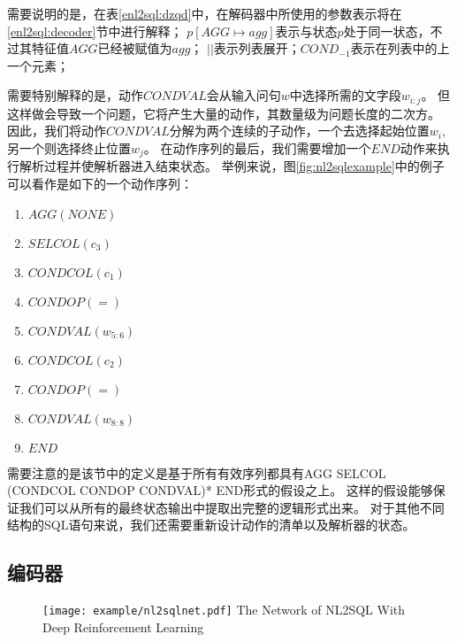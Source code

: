 需要说明的是，在表\ref{enl2sql:dzqd}中，在解码器中所使用的参数表示将在\ref{enl2sql:decoder}节中进行解释；
$p[AGG \mapsto agg]$表示与状态$p$处于同一状态，不过其特征值$AGG$已经被赋值为$agg$；
$||$表示列表展开；$COND_{-1}$表示在列表中的上一个元素；


需要特别解释的是，动作$CONDVAL$会从输入问句$w$中选择所需的文字段$w_{i:j}$。
但这样做会导致一个问题，它将产生大量的动作，其数量级为问题长度的二次方。
因此，我们将动作$CONDVAL$分解为两个连续的子动作，一个去选择起始位置$w_i$,另一个则选择终止位置$w_j$。
在动作序列的最后，我们需要增加一个$END$动作来执行解析过程并使解析器进入结束状态。
举例来说，图\ref{fig:nl2sqlexample}中的例子可以看作是如下的一个动作序列：
\begin{enumerate}
  \item $AGG(NONE)$
  \item $SELCOL(c_3)$
  \item $CONDCOL(c_1)$
  \item $CONDOP(=)$
  \item $CONDVAL(w_{5:6})$
  \item $CONDCOL(c_2)$
  \item $CONDOP(=)$
  \item $CONDVAL(w_{8:8})$
  \item $END$
\end{enumerate}

需要注意的是该节中的定义是基于所有有效序列都具有AGG  SELCOL  (CONDCOL  CONDOP  CONDVAL)* END形式的假设之上。
这样的假设能够保证我们可以从所有的最终状态输出中提取出完整的逻辑形式出来。
对于其他不同结构的SQL语句来说，我们还需要重新设计动作的清单以及解析器的状态。


\subsection{编码器}
\label{enl2sql:encoder}

\begin{figure}[!htp]
  \centering
  \texttt{[image: example/nl2sqlnet.pdf]}
    {The Network of NL2SQL With Deep Reinforcement Learning}
  \label{fig:nl2sqlnet}
\end{figure}


